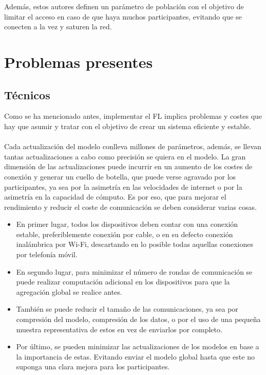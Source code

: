 Además, estos autores definen un parámetro de población con el objetivo de limitar el acceso en caso de que haya muchos participantes, evitando que se conecten a la vez y saturen la red.

\section{Problemas presentes}
\subsection{Técnicos}
Como se ha mencionado antes, implementar el FL implica problemas y costes que hay que asumir y tratar con el objetivo de crear un sistema eficiente y estable. 
\\ \\
Cada actualización del modelo conlleva millones de parámetros, además, se llevan tantas actualizaciones a cabo como precisión se quiera en el modelo. La gran dimensión de las actualizaciones puede incurrir en un aumento de los costes de conexión y generar un cuello de botella, que puede verse agravado por los participantes, ya sea por la asimetría en las velocidades de internet o por la asimetría en la capacidad de cómputo. Es por eso, que para mejorar el rendimiento y reducir el coste de comunicación se deben considerar varias cosas.
\begin{itemize}
    \item En primer lugar, todos los dispositivos deben contar con una conexión estable, preferiblemente conexión por cable, o en su defecto conexión inalámbrica por Wi-Fi, descartando en lo posible todas aquellas conexiones por telefonía móvil.
    \item En segundo lugar, para minimizar el número de rondas de comunicación se puede realizar computación adicional en los dispositivos para que la agregación global se realice antes.
    \item También se puede reducir el tamaño de las comunicaciones, ya sea por compresión del modelo, compresión de los datos, o por el uso de una pequeña muestra representativa de estos en vez de enviarlos por completo.
    \item Por último, se pueden minimizar las actualizaciones de los modelos en base a la importancia de estas. Evitando enviar el modelo global hasta que este no suponga una clara mejora para los participantes.
\end{itemize}


